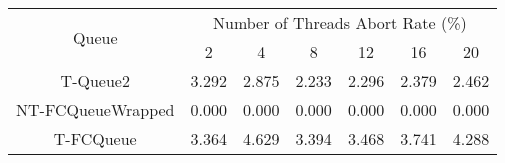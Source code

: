 \begin{tabular}{|c|c|c|c|c|c|c|}
\hline
\multirow{2}{*}{Queue} & \multicolumn{6}{c|}{Number of Threads Abort Rate (\%)}\\\cline{2-7}& 2 & 4 & 8 & 12 & 16 & 20\\
\hline
\hline
T-Queue2 & 3.292 & 2.875 & 2.233 & 2.296 & 2.379 & 2.462\\
NT-FCQueueWrapped & 0.000 & 0.000 & 0.000 & 0.000 & 0.000 & 0.000\\
T-FCQueue & 3.364 & 4.629 & 3.394 & 3.468 & 3.741 & 4.288\\
\hline\end{tabular}
